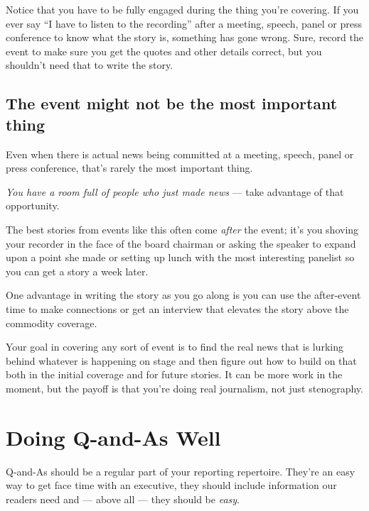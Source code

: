 \documentclass[
  11pt,
  american,
  letterpaperpaper,
  extrafontsizes,onecolumn,openright
  ]{memoir}
\begin{document}
Notice that you have to be fully engaged during the thing you're covering. If you ever say \enquote{I have to listen to the recording} after a meeting, speech, panel or press conference to know what the story is, something has gone wrong. Sure, record the event to make sure you get the quotes and other details correct, but you shouldn't need that to write the story.

\hypertarget{the-event-might-not-be-the-most-important-thing}{%
\section*{The event might not be the most important thing}\label{the-event-might-not-be-the-most-important-thing}}

Even when there is actual news being committed at a meeting, speech, panel or press conference, that's rarely the most important thing.

\emph{You have a room full of people who just made news} --- take advantage of that opportunity.

The best stories from events like this often come \emph{after} the event; it's you shoving your recorder in the face of the board chairman or asking the speaker to expand upon a point she made or setting up lunch with the most interesting panelist so you can get a story a week later.

One advantage in writing the story as you go along is you can use the after-event time to make connections or get an interview that elevates the story above the commodity coverage.

Your goal in covering any sort of event is to find the real news that is lurking behind whatever is happening on stage and then figure out how to build on that both in the initial coverage and for future stories. It can be more work in the moment, but the payoff is that you're doing real journalism, not just stenography.

\hypertarget{doing-q-and-as-well}{%
\chapter{Doing Q-and-As Well}\label{doing-q-and-as-well}}

Q-and-As should be a regular part of your reporting repertoire. They're an easy way to get face time with an executive, they should include information our readers need and --- above all --- they should be \emph{easy}.
\end{document}
